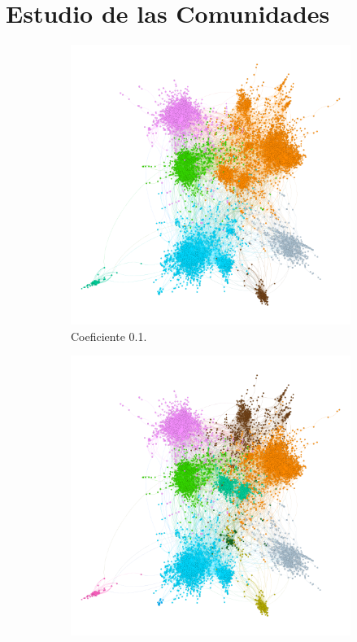 \section{Estudio de las Comunidades}

\begin{figure}
  \centering  
  \begin{subfigure}[t]{0.48\textwidth}
    \centering
    \includegraphics[width=\textwidth]{img/resultados/grado-leinen0.1.png}
    \caption{Coeficiente 0.1.}
  \end{subfigure}
  \vspace{7mm}
  \hfill
  \begin{subfigure}[t]{0.48\textwidth}
    \centering
    \includegraphics[width=\textwidth]{img/resultados/grado-leinen0.25.png}

\end{subfigure}
\end{figure}
